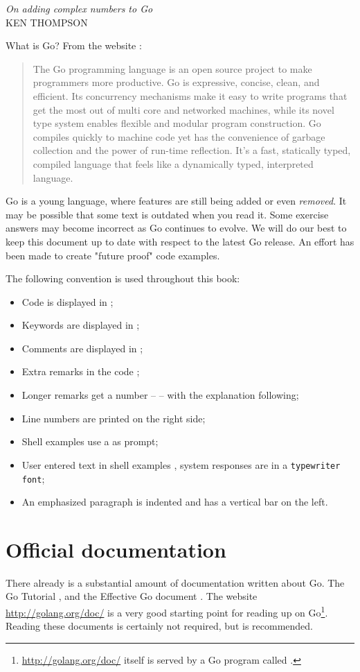 {\textit{On adding complex numbers to Go}\\ \textsc{KEN THOMPSON}}

\noindent{}What is Go? From the website \cite{go_web}:
\begin{quote}
The Go programming language is an open source project to make
programmers more productive. Go is expressive, concise, clean, and
efficient. Its concurrency mechanisms make it easy to write programs
that get the most out of multi core and networked machines, while its
novel type system enables flexible and modular program construction. Go
compiles quickly to machine code yet has the convenience of garbage
collection and the power of run-time reflection. It's a fast, statically
typed, compiled language that feels like a dynamically typed,
interpreted language.
\end{quote}

Go is a young language, where 
features are still being added or even \emph{removed}. It 
may be possible that some text is outdated when you
read it. 
Some exercise answers may become incorrect as Go continues
to evolve.
We will do our best to keep this document up to 
date with respect to the latest Go release.
An effort has been made to create "future proof" code examples.

The following convention is used throughout this book:
\begin{itemize}
\item Code is displayed in ;
\item Keywords are displayed in ;
\item Comments are displayed in ;
\item Extra remarks in the code ;
\item Longer remarks get a number --  -- with the explanation following;
\item Line numbers are printed on the right side;
\item Shell examples use a \pr{} as prompt;
\item User entered text in shell examples \texttt{}, system responses
are in a \texttt{typewriter font};
\item An emphasized paragraph is indented and has a vertical bar on the
left.
\end{itemize}

\section{Official documentation}
There already is a substantial amount of documentation written about Go.
The Go Tutorial \cite{go_tutorial}, and the Effective Go
document \cite{effective_go}. The
website \url{http://golang.org/doc/} is a very good starting point
for reading up on Go\footnote{\url{http://golang.org/doc/} itself is served by 
a Go program called .}. Reading these documents is
certainly not required, but is recommended.

